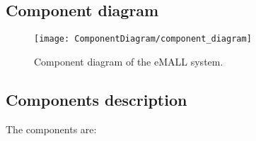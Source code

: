\subsection{Component diagram}
\label{subsec:component_diagram}%
\begin{figure} [H]
    \begin{center}
        \texttt{[image: ComponentDiagram/component\_diagram]}
        \caption{Component diagram of the eMALL system.}
        \label{fig: cd}
    \end{center}
\end{figure}

\subsection{Components description}
\label{subsec:components_description}%
The components are:
